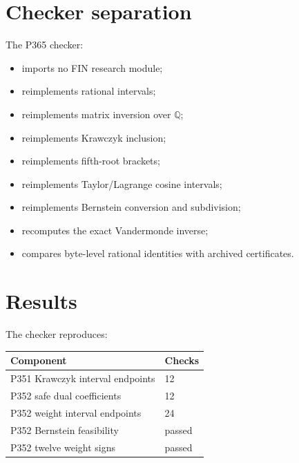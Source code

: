 \documentclass[11pt,a4paper,openany]{report}
\begin{document}
\section{Checker separation}

The P365 checker:

\begin{itemize}
\item 
imports no FIN research module;

\item 
reimplements rational intervals;

\item 
reimplements matrix inversion over \(\mathbb Q\);

\item 
reimplements Krawczyk inclusion;

\item 
reimplements fifth-root brackets;

\item 
reimplements Taylor/\allowbreak{}Lagrange cosine intervals;

\item 
reimplements Bernstein conversion and subdivision;

\item 
recomputes the exact Vandermonde inverse;

\item 
compares byte-level rational identities with archived certificates.

\end{itemize}

\section{Results}

The checker reproduces:

\begin{center}
\begingroup\small
\setlength{\tabcolsep}{2.5pt}
\renewcommand{\arraystretch}{1.16}
\begin{longtable}{@{}p{}p{}@{}}
\toprule
\textbf{Component} & \textbf{Checks} \\
\midrule
\endhead
P351 Krawczyk interval endpoints & 12 \\
P352 safe dual coefficients & 12 \\
P352 weight interval endpoints & 24 \\
P352 Bernstein feasibility & passed \\
P352 twelve weight signs & passed \\
\bottomrule
\end{longtable}
\endgroup
\end{center}
\end{document}
